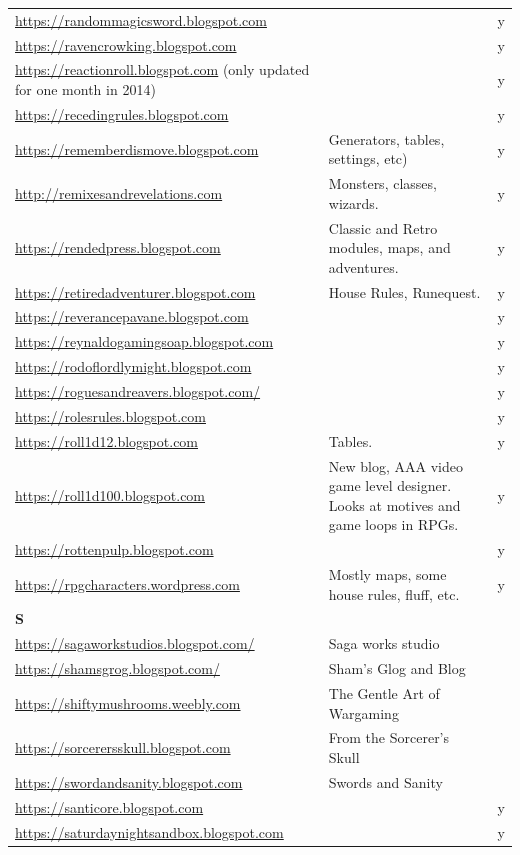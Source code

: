 \documentclass[a4paper, 11pt, twoside]{article}
\begin{document}
\begin{longtable}{p{6cm}p{8cm}c}
\url{https://randommagicsword.blogspot.com} &  & y\\
\url{https://ravencrowking.blogspot.com} &  & y\\
\url{https://reactionroll.blogspot.com} (only updated for one month in 2014) &  & y\\
\url{https://recedingrules.blogspot.com} &  & y\\
\url{https://rememberdismove.blogspot.com} & Generators, tables, settings, etc) & y\\
\url{http://remixesandrevelations.com} & Monsters, classes, wizards. & y\\
\url{https://rendedpress.blogspot.com} & Classic and Retro modules, maps, and adventures. & y\\
\url{https://retiredadventurer.blogspot.com} & House Rules, Runequest. & y\\
\url{https://reverancepavane.blogspot.com} &  & y\\
\url{https://reynaldogamingsoap.blogspot.com} &  & y\\
\url{https://rodoflordlymight.blogspot.com} &  & y\\
\url{https://roguesandreavers.blogspot.com/} &  & y\\
\url{https://rolesrules.blogspot.com} &  & y\\
\url{https://roll1d12.blogspot.com} & Tables. & y\\
\url{https://roll1d100.blogspot.com} & New blog, AAA video game level designer. Looks at motives and game loops in RPGs. & y\\
\url{https://rottenpulp.blogspot.com} &  & y\\
\url{https://rpgcharacters.wordpress.com} & Mostly maps, some house rules, fluff, etc. & y\\
\textbf{S} &  & \\
\url{https://sagaworkstudios.blogspot.com/} & Saga works studio & \\
\url{https://shamsgrog.blogspot.com/} & Sham's Glog and Blog & \\
\url{https://shiftymushrooms.weebly.com} & The Gentle Art of Wargaming & \\
\url{https://sorcerersskull.blogspot.com} & From the Sorcerer's Skull & \\
\url{https://swordandsanity.blogspot.com} & Swords and Sanity & \\
\url{https://santicore.blogspot.com} &  & y\\
\url{https://saturdaynightsandbox.blogspot.com} &  & y\\

\end{longtable}
\end{document}
